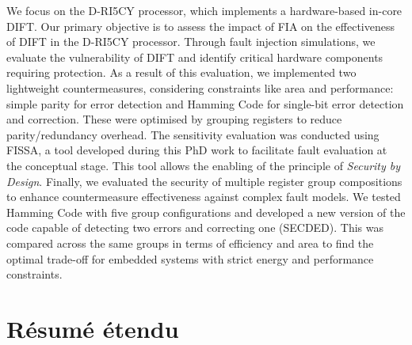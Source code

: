 We focus on the \mbox{D-RI5CY} processor, which implements a hardware-based in-core DIFT. Our primary objective is to assess the impact of FIA on the effectiveness of DIFT in the \mbox{D-RI5CY} processor. Through fault injection simulations, we evaluate the vulnerability of DIFT and identify critical hardware components requiring protection. 
As a result of this evaluation, we implemented two lightweight countermeasures, considering constraints like area and performance: simple parity for error detection and Hamming Code for single-bit error detection and correction. These were optimised by grouping registers to reduce parity/redundancy overhead. The sensitivity evaluation was conducted using FISSA, a tool developed during this PhD work to facilitate fault evaluation at the conceptual stage. This tool allows the enabling of the principle of \textit{Security by Design}.
Finally, we evaluated the security of multiple register group compositions to enhance countermeasure effectiveness against complex fault models. We tested Hamming Code with five group configurations and developed a new version of the code capable of detecting two errors and correcting one (SECDED). This was compared across the same groups in terms of efficiency and area to find the optimal trade-off for embedded systems with strict energy and performance constraints.


\chapter*{Résumé étendu}
\label{chapter:extended_resume}
